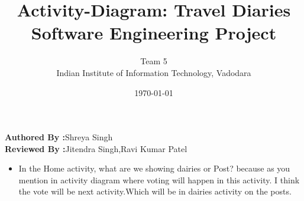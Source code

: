 \documentclass[12pt]{article}
\title{Activity-Diagram: Travel Diaries\\Software Engineering Project }
\author{Team 5\\Indian Institute of Information Technology, Vadodara}
\date{\today}
\begin{document}
	\maketitle
	\begin{center}
		\textbf{\Large{Authored By :}}\Large{Shreya Singh}  \\
		\textbf{\Large{Reviewed By :}}\Large{Jitendra Singh,Ravi Kumar Patel} \\[2\baselineskip]  
			\end{center}
		
		\begin{itemize}
		
		\item In the Home activity, what are we showing dairies or Post? because as you mention in activity diagram where voting will  happen in this activity. I think the vote will be next activity.Which will be in dairies activity on the  posts.
		\end{itemize}
	
\end{document}
